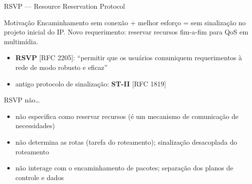 \documentclass[aspectratio=169,11pt]{beamer}
\begin{document}
\begin{frame}{RSVP --- Resource Reservation Protocol}
  \begin{block}{Motivação}
    Encaminhamento sem conexão + melhor esforço = sem sinalização no projeto inicial do IP.
    Novo requerimento: reservar recursos fim-a-fim para QoS em multimídia.
  \end{block}
  \begin{itemize}
    \item \textbf{RSVP} [RFC 2205]: ``permitir que os usuários comuniquem requerimentos à rede de modo robusto e eficaz''
    \item antigo protocolo de sinalização: \textbf{ST-II} [RFC 1819]
  \end{itemize}
  \begin{block}{RSVP não\ldots}
    \begin{itemize}
      \item não especifica como reservar recursos (é um mecanismo de comunicação de necessidades)
      \item não determina as rotas (tarefa do roteamento); sinalização desacoplada do roteamento
      \item não interage com o encaminhamento de pacotes; separação dos planos de controle e dados
    \end{itemize}
  \end{block}
\end{frame}
\end{document}
